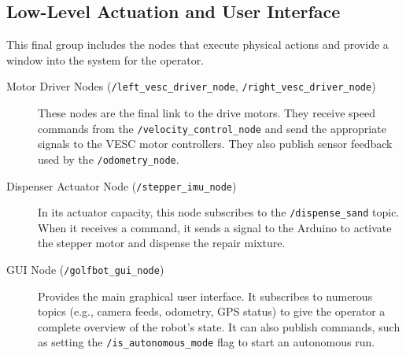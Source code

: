 \subsection{Low-Level Actuation and User Interface}
This final group includes the nodes that execute physical actions and provide a window into the system for the operator.
\begin{description}
    \item[Motor Driver Nodes (\texttt{/left\_vesc\_driver\_node}, \texttt{/right\_vesc\_driver\_node})] These nodes are the final link to the drive motors. They receive speed commands from the \texttt{/velocity\_control\_node} and send the appropriate signals to the VESC motor controllers. They also publish sensor feedback used by the \texttt{/odometry\_node}.
    \item[Dispenser Actuator Node (\texttt{/stepper\_imu\_node})] In its actuator capacity, this node subscribes to the \texttt{/dispense\_sand} topic. When it receives a command, it sends a signal to the Arduino to activate the stepper motor and dispense the repair mixture.
    \item[GUI Node (\texttt{/golfbot\_gui\_node})] Provides the main graphical user interface. It subscribes to numerous topics (e.g., camera feeds, odometry, GPS status) to give the operator a complete overview of the robot's state. It can also publish commands, such as setting the \texttt{/is\_autonomous\_mode} flag to start an autonomous run.
\end{description}

